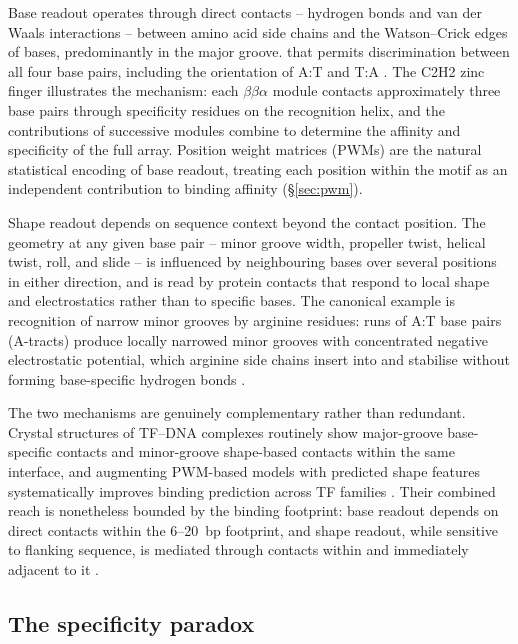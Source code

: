 Base readout operates through direct contacts -- hydrogen bonds and van der Waals interactions -- between amino acid side chains and the Watson--Crick edges of bases, predominantly in the major groove.
 that permits discrimination between all four base pairs, including the orientation of A:T and T:A \cite{luscombeAminoAcidbaseInteractions2001, seemanSequencespecificRecognitionDouble1976}.
The C2H2 zinc finger illustrates the mechanism: each $\beta\beta\alpha$ module contacts approximately three base pairs through specificity residues on the recognition helix, and the contributions of successive modules combine to determine the affinity and specificity of the full array.
Position weight matrices (PWMs) are the natural statistical encoding of base readout, treating each position within the motif as an independent contribution to binding affinity (§\ref{sec:pwm}).

Shape readout depends on sequence context beyond the contact position.
The geometry at any given base pair -- minor groove width, propeller twist, helical twist, roll, and slide -- is influenced by neighbouring bases over several positions in either direction, and is read by protein contacts that respond to local shape and electrostatics rather than to specific bases.
The canonical example is recognition of narrow minor grooves by arginine residues: runs of A:T base pairs (A-tracts) produce locally narrowed minor grooves with concentrated negative electrostatic potential, which arginine side chains insert into and stabilise without forming base-specific hydrogen bonds \cite{rohsRoleDNAShape2009}.

The two mechanisms are genuinely complementary rather than redundant.
Crystal structures of TF--DNA complexes routinely show major-groove base-specific contacts and minor-groove shape-based contacts within the same interface, and augmenting PWM-based models with predicted shape features systematically improves binding prediction across TF families \cite{mathelierDNAShapeFeatures2016}.
Their combined reach is nonetheless bounded by the binding footprint: base readout depends on direct contacts within the 6--20~bp footprint, and shape readout, while sensitive to flanking sequence, is mediated through contacts within and immediately adjacent to it \cite{yangTranscriptionFactorFamilyspecific2017}.

\subsection{The specificity paradox}
\label{sec:paradox}


